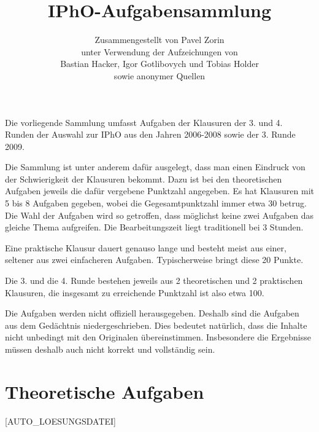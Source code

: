 \documentclass[12pt,a4paper]{article}
\title{IPhO-Aufgabensammlung}
\author{Zusammengestellt von Pavel Zorin\\
unter Verwendung der Aufzeichungen von\\
Bastian Hacker, Igor Gotlibovych und Tobias Holder\\
sowie anonymer Quellen}
\begin{document}
\maketitle

Die vorliegende Sammlung umfasst Aufgaben der Klausuren der 3. und 4. Runden der Auswahl zur IPhO aus den Jahren 2006-2008 sowie der 3. Runde 2009.

Die Sammlung ist unter anderem dafür ausgelegt, dass man einen Eindruck von der Schwierigkeit der Klausuren bekommt. Dazu ist bei den theoretischen Aufgaben jeweils die dafür vergebene Punktzahl angegeben. Es hat Klausuren mit 5 bis 8 Aufgaben gegeben, wobei die Gegesamtpunktzahl immer etwa 30 betrug. Die Wahl der Aufgaben wird so getroffen, dass möglichst keine zwei Aufgaben das gleiche Thema aufgreifen. Die Bearbeitungszeit liegt traditionell bei 3 Stunden.

Eine praktische Klausur dauert genauso lange und besteht meist aus einer, seltener aus zwei einfacheren Aufgaben. Typischerweise bringt diese 20 Punkte.

Die 3. und die 4. Runde bestehen jeweils aus 2 theoretischen und 2 praktischen Klausuren, die insgesamt zu erreichende Punktzahl ist also etwa 100.

Die Aufgaben werden nicht offiziell herausgegeben. Deshalb sind die Aufgaben aus dem Gedächtnis niedergeschrieben. Dies bedeutet natürlich, dass die Inhalte nicht unbedingt mit den Originalen übereinstimmen. Insbesondere die Ergebnisse müssen deshalb auch nicht korrekt und vollständig sein.


\section*{Theoretische Aufgaben}

[AUTO_LOESUNGSDATEI]

\end{document}
